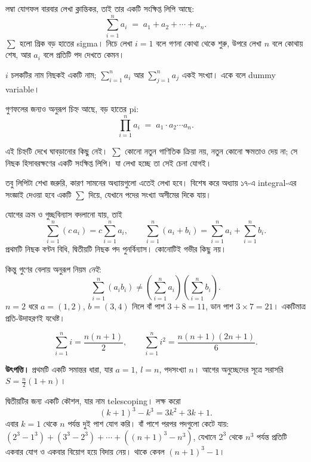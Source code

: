 \documentclass[11pt]{article}
\begin{document}
\begin{idea}[যোগচিহ্ন]
লম্বা যোগফল বারবার লেখা ক্লান্তিকর, তাই তার একটি সংক্ষিপ্ত লিপি আছে:
\[
  \sum_{i=1}^{n} a_i \;=\; a_1 + a_2 + \cdots + a_n .
\]
$\sum$ হলো গ্রিক বড় হাতের sigma। নিচে লেখা $i = 1$ বলে গণনা কোথা থেকে শুরু,
উপরে লেখা $n$ বলে কোথায় শেষ, আর $a_i$ বলে প্রতিটি পদ দেখতে কেমন।

$i$ চলকটির নাম নিছকই একটি নাম; $\sum_{i=1}^{n} a_i$ আর $\sum_{j=1}^{n} a_j$
একই সংখ্যা। একে বলে dummy variable।

গুণফলের জন্যও অনুরূপ চিহ্ন আছে, বড় হাতের pi:
\[
  \prod_{i=1}^{n} a_i \;=\; a_1 \cdot a_2 \cdots a_n .
\]
\end{idea}

\begin{remark}
এই চিহ্নটি দেখে ঘাবড়ানোর কিছু নেই। $\sum$ কোনো নতুন গাণিতিক ক্রিয়া নয়, নতুন
কোনো ক্ষমতাও দেয় না; সে নিছক হিসাবরক্ষণের একটি সংক্ষিপ্ত লিপি। যা লেখা হচ্ছে
তা সেই চেনা যোগই।

তবু লিপিটা শেখা জরুরি, কারণ সামনের অধ্যায়গুলো এতেই লেখা হবে। বিশেষ করে
অধ্যায় ১৭-এ integral-এর সংজ্ঞাই দেওয়া হবে একটি $\sum$ দিয়ে, যেখানে পদের
সংখ্যা অসীমের দিকে যায়।
\end{remark}

\begin{idea}[দুটি নিয়ম, আর একটি ফাঁদ]
যোগের ক্রম ও গুচ্ছবিন্যাস বদলানো যায়, তাই
\[
  \sum_{i=1}^{n} (c\,a_i) = c \sum_{i=1}^{n} a_i ,
  \qquad
  \sum_{i=1}^{n} (a_i + b_i) = \sum_{i=1}^{n} a_i + \sum_{i=1}^{n} b_i .
\]
প্রথমটি নিছক বণ্টন বিধি, দ্বিতীয়টি নিছক পদ পুনর্বিন্যাস। কোনোটিই গভীর কিছু নয়।

কিন্তু গুণের বেলায় অনুরূপ নিয়ম \emph{নেই}:
\[
  \sum_{i=1}^{n} (a_i b_i) \neq \left( \sum_{i=1}^{n} a_i \right)
                                 \left( \sum_{i=1}^{n} b_i \right) .
\]
$n = 2$ ধরে $a = (1,2)$, $b = (3,4)$ নিলে বাঁ পাশ $3 + 8 = 11$, ডান পাশ
$3 \times 7 = 21$। একটিমাত্র প্রতি-উদাহরণই যথেষ্ট।
\end{idea}

\begin{idea}
\[
  \sum_{i=1}^{n} i = \frac{n(n+1)}{2} ,
  \qquad
  \sum_{i=1}^{n} i^{2} = \frac{n(n+1)(2n+1)}{6} .
\]
\end{idea}

\noindent
\textbf{উৎপত্তি।} প্রথমটি একটি সমান্তর ধারা, যার $a = 1$, $l = n$, পদসংখ্যা
$n$। আগের অনুচ্ছেদের সূত্রে সরাসরি $S = \tfrac{n}{2}(1 + n)$।

দ্বিতীয়টির জন্য একটি কৌশল, যার নাম telescoping। লক্ষ করো
\[
  (k+1)^{3} - k^{3} = 3k^{2} + 3k + 1 .
\]
এবার $k = 1$ থেকে $n$ পর্যন্ত দুই পাশ যোগ করি। বাঁ পাশে পরপর পদগুলো কেটে যায়:
$(2^3 - 1^3) + (3^3 - 2^3) + \cdots + ((n+1)^3 - n^3)$, যেখানে $2^3$ থেকে $n^3$
পর্যন্ত প্রতিটি একবার যোগ ও একবার বিয়োগ হয়ে বিদায় নেয়। থাকে কেবল
$(n+1)^{3} - 1$।
\end{document}
